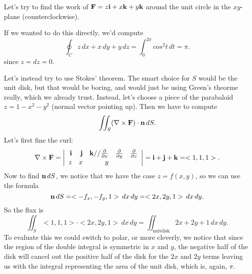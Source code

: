 \bex
Let's try to find the work of $\boldsymbol{\mathbf{F}} = z\boldsymbol{\mathbf{i}}+ x\boldsymbol{\mathbf{k}} +y\boldsymbol{\mathbf{k}}$ around the unit circle in the $xy$-plane (counterclockwise). 

If we wanted to do this directly, we'd compute
\[ \oint_C z\,dx + x\,dy + y\,dz = \int_0^{2\pi} cos^2 t\,dt = \pi. \]
since $z=dz=0$.

Let's instead try to use Stokes' theorem. The smart choice for $S$ would be the unit disk, but that would be boring, and would just be using Green's theorme really, which we already trust. Instead, let's choose a piece of the parabaloid $z = 1-x^2-y^2$ (normal vector pointing up). Then we have to compute
\[ \iint_S (\nabla \times \boldsymbol{\mathbf{F}}) \cdot \boldsymbol{\mathbf{n}} \, dS. \]
Let's first fine the curl:
\[ \nabla \times \boldsymbol{\mathbf{F}} = \left| \begin{array}{rrrrrrrrrrrrrrrrrrrrrrrrr} \boldsymbol{\mathbf{i}}&\boldsymbol{\mathbf{j}}&\boldsymbol{\mathbf{k}}//\frac{\partial }{\partial x}&\frac{\partial }{\partial y}&\frac{\partial }{\partial z}\\z&x&y\\ \end{array} \right| = \boldsymbol{\mathbf{i}} + \boldsymbol{\mathbf{j}} + \boldsymbol{\mathbf{k}} = <1,1,1>. \]
Now to find $\boldsymbol{\mathbf{n}} \,dS$, we notice that we have the case $z = f(x,y)$, so we can use the formula
\[ \boldsymbol{\mathbf{n}}\,dS = <-f_x,-f_y,1>\,dx\,dy = <2x,2y,1>\,dx\,dy. \]
So the flux is
\[ \iint_S <1,1,1>\cdot<2x,2y,1>\,dx\,dy = \iint_{\mathrm{unit disk}} 2x+2y+1\,dx\,dy. \]
To evaluate this we could switch to polar, or more cleverly, we notice that since the region of the double integral is symmetric in $x$ and $y$, the negative half of the disk will cancel out the positive half of the disk for the $2x$ and $2y$ terms leaving us with the integral representing the area of the unit disk, which is, again, $\pi$.
\eex